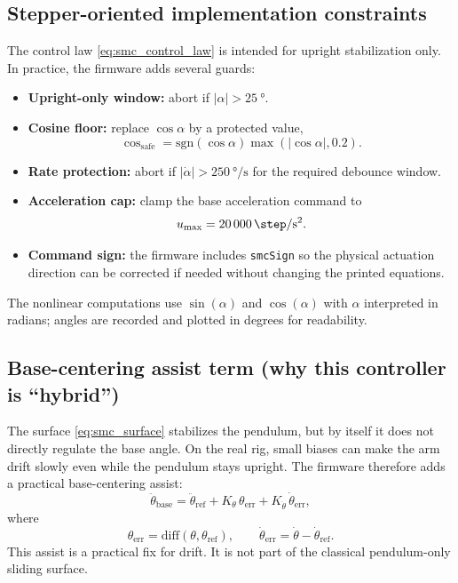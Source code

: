 \subsection{Stepper-oriented implementation constraints}
The control law \eqref{eq:smc_control_law} is intended for upright stabilization only. In practice, the firmware adds several guards:
\begin{itemize}
  \item \textbf{Upright-only window:} abort if $|\alpha|>\SI{25}{\degree}$.
  \item \textbf{Cosine floor:} replace $\cos\alpha$ by a protected value,
  \[
  \cos_{\mathrm{safe}}
  =\mathrm{sgn}(\cos\alpha)\max(|\cos\alpha|,0.2).
  \]
  \item \textbf{Rate protection:} abort if $|\dot{\alpha}|>\SI{250}{\degree\per\second}$ for the required debounce window.
  \item \textbf{Acceleration cap:} clamp the base acceleration command to
  \[
  u_{\max}=\SI{20000}{\step\per\second\squared}.
  \]
  \item \textbf{Command sign:} the firmware includes \texttt{smcSign} so the physical actuation direction can be corrected if needed without changing the printed equations.
\end{itemize}
The nonlinear computations use $\sin(\alpha)$ and $\cos(\alpha)$ with $\alpha$ interpreted in radians; angles are recorded and plotted in degrees for readability.

\subsection{Base-centering assist term (why this controller is ``hybrid'')}
The surface \eqref{eq:smc_surface} stabilizes the pendulum, but by itself it does not directly regulate the base angle. On the real rig, small biases can make the arm drift slowly even while the pendulum stays upright. The firmware therefore adds a practical base-centering assist:
\begin{equation}
\ddot{\theta}_{\mathrm{base}}
=
\ddot{\theta}_{\mathrm{ref}}
+ K_{\theta}\,\theta_{\mathrm{err}}
+ K_{\dot{\theta}}\,\dot{\theta}_{\mathrm{err}},
\label{eq:smc_base_assist}
\end{equation}
where
\[
\theta_{\mathrm{err}}=\mathrm{diff}(\theta,\theta_{\mathrm{ref}}),\qquad
\dot{\theta}_{\mathrm{err}}=\dot{\theta}-\dot{\theta}_{\mathrm{ref}}.
\]
This assist is a practical fix for drift. It is not part of the classical pendulum-only sliding surface.


